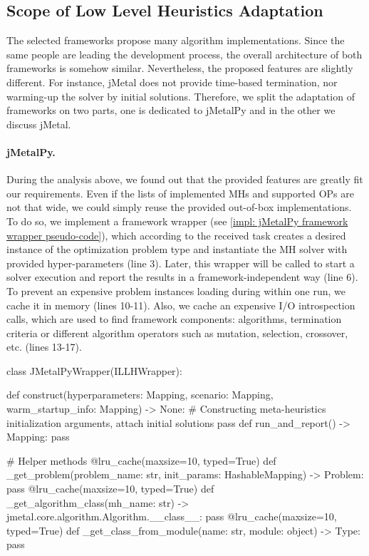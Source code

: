 \subsection{Scope of Low Level Heuristics Adaptation}
The selected frameworks propose many algorithm implementations. Since the same people are leading the development process, the overall architecture of both frameworks is somehow similar. Nevertheless, the proposed features are slightly different. For instance, jMetal does not provide time-based termination, nor warming-up the solver by initial solutions. Therefore, we split the adaptation  of frameworks on two parts, one is dedicated to jMetalPy and in the other we discuss jMetal.

\paragraph{jMetalPy.} During the analysis above, we found out that the provided features are greatly fit our requirements. Even if the lists of implemented MHs and supported OPs are not that wide, we could simply reuse the provided out-of-box implementations. To do so, we implement a framework wrapper (see \cref{impl: jMetalPy framework wrapper pseudo-code}), which according to the received task creates a desired instance of the optimization problem type and instantiate the MH solver with provided hyper-parameters (line 3). Later, this wrapper will be called to start a solver execution and report the results in a framework-independent way (line 6). To prevent an expensive problem instances loading during within one run, we cache it in memory (lines 10-11). Also, we cache an expensive I/O introspection calls, which are used to find framework components: algorithms, termination criteria or different algorithm operators such as mutation, selection, crossover, etc. (lines 13-17).

\begin{code}[language=Python, caption=jMetalPy framework wrapper pseudo-code., label=impl: jMetalPy framework wrapper pseudo-code]
class JMetalPyWrapper(ILLHWrapper):

	def construct(hyperparameters: Mapping, scenario: Mapping, warm_startup_info: Mapping) -> None:
		# Constructing meta-heuristics initialization arguments, attach initial solutions
		pass
	def run_and_report() -> Mapping:
		pass

	# Helper methods
	@lru_cache(maxsize=10, typed=True)
	def _get_problem(problem_name: str, init_params: HashableMapping) -> Problem:
		pass
	@lru_cache(maxsize=10, typed=True)
	def _get_algorithm_class(mh_name: str) -> jmetal.core.algorithm.Algorithm.__class__:
		pass
	@lru_cache(maxsize=10, typed=True)
	def _get_class_from_module(name: str, module: object) -> Type:
		pass
\end{code}

